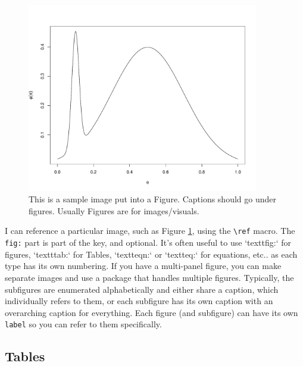 \documentclass[12pt]{article}
\begin{document}
\begin{center}
\begin{figure}
	\includegraphics[width=0.9\textwidth]{Rplot}
	\caption{\label{fig:sampleimage1} This is a sample image put into a Figure. Captions should go under figures. Usually Figures are for images/visuals.}
\end{figure}
\end{center}

I can reference a particular image, such as Figure \ref{fig:sampleimage1}, using the \verb|\ref| macro. The \texttt{fig:} part is part of the key, and optional. It's often useful to use `textt{fig:}` for figures, `textt{tab:}` for Tables, `textt{eqn:}` or `textt{eq:}` for equations, etc.. as each type has its own numbering. If you have a multi-panel figure, you can make separate images and use a package that handles multiple figures. Typically, the subfigures are enumerated alphabetically and either share a caption, which individually refers to them, or each subfigure has its own caption with an overarching caption for everything. Each figure (and subfigure) can have its own \texttt{label} so you can refer to them specifically.


\subsection {Tables}
	 
\end{document}
